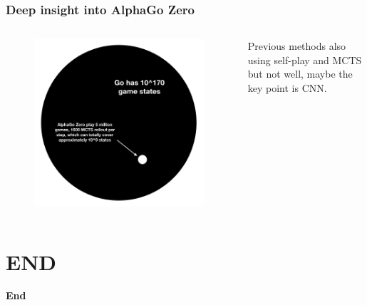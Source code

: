 \documentclass[notheorems, aspectratio=54]{beamer}
\begin{document}
\begin{frame}
    \frametitle{Deep insight into AlphaGo Zero}

    \begin{columns}
        \begin{column}{.6\textwidth}
            \begin{figure}
                \includegraphics[width=\textwidth]{fig/go_state_space.png}
            \end{figure}
        \end{column}
        \begin{column}{.4\textwidth}
            Previous methods also using self-play and MCTS but not well, maybe the key point is CNN.
        \end{column}
    \end{columns}
\end{frame}


\section{END}
\begin{frame}
    \center \huge \textbf{End}
\end{frame}
\end{document}
